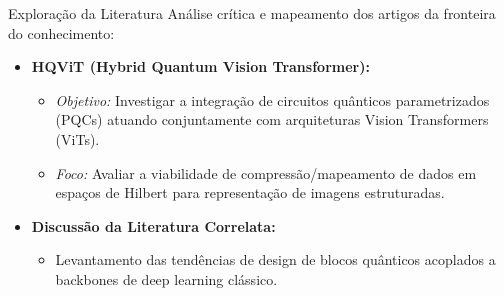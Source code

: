\documentclass[aspectratio=169, 11pt]{beamer}
\begin{document}
\begin{frame}{Exploração da Literatura}
    Análise crítica e mapeamento dos artigos da fronteira do conhecimento:
    
    \vspace{0.3cm}
    \begin{itemize}
        \item \textbf{HQViT (Hybrid Quantum Vision Transformer):}
        \begin{itemize}
            \item \textit{Objetivo:} Investigar a integração de circuitos quânticos parametrizados (PQCs) atuando conjuntamente com arquiteturas Vision Transformers (ViTs).
            \item \textit{Foco:} Avaliar a viabilidade de compressão/mapeamento de dados em espaços de Hilbert para representação de imagens estruturadas.
        \end{itemize}
        \vfill
        \item \textbf{Discussão da Literatura Correlata:}
        \begin{itemize}
            \item Levantamento das tendências de design de blocos quânticos acoplados a backbones de deep learning clássico.
        \end{itemize}
    \end{itemize}
\end{frame}
\end{document}

